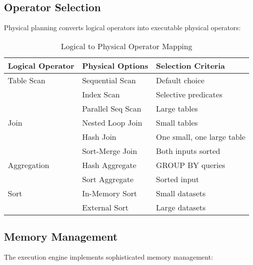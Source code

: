\documentclass[12pt,a4paper]{article}
\begin{document}
\subsection{Operator Selection}

Physical planning converts logical operators into executable physical operators:

\begin{table}[htbp]
\centering
\caption{Logical to Physical Operator Mapping}
\label{tab:operators}
\begin{tabular}{lll}
\toprule
\textbf{Logical Operator} & \textbf{Physical Options} & \textbf{Selection Criteria} \\
\midrule
Table Scan & Sequential Scan & Default choice \\
           & Index Scan & Selective predicates \\
           & Parallel Seq Scan & Large tables \\
\midrule
Join & Nested Loop Join & Small tables \\
     & Hash Join & One small, one large table \\
     & Sort-Merge Join & Both inputs sorted \\
\midrule
Aggregation & Hash Aggregate & GROUP BY queries \\
           & Sort Aggregate & Sorted input \\
\midrule
Sort & In-Memory Sort & Small datasets \\
     & External Sort & Large datasets \\
\bottomrule
\end{tabular}
\end{table}

\subsection{Memory Management}

The execution engine implements sophisticated memory management:
\end{document}
